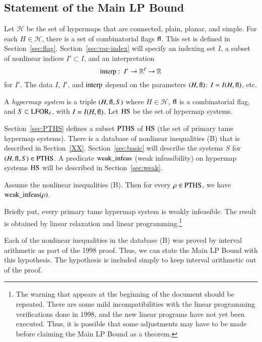 \subsection{Statement of the Main LP Bound}

Let $\mathcal H$ be the set of  hypermaps that are connected,
plain, planar, and simple. For each $H\in \mathcal H$, there is a
set of combinatorial flags ${\operatorname{fl}}$.  This set is defined in
Section~\ref{sec:flag}.  Section~\ref{sec:var-index} will specify
an indexing set $I$, a subset of nonlinear indices $I'\subset I$,
and an interpretation
  $${\operatorname{interp}}:\ I'\to \mathbb{R}^I\to\mathbb{R}$$
for $I'$.  The data $I$, $I'$, and ${\operatorname{interp}}$ depend on the
parameters $(H,{\operatorname{fl}})$: $I = I(H,{\operatorname{fl}})$, etc.

\begin{definition}
A {\it hypermap system} is a triple $(H,{\operatorname{fl}},S)$ where
    $H\in {\mathcal H}$,
    ${\operatorname{fl}}$ is a
    combinatorial flag,
    and $S\subset {\operatorname{LFOR}}_I$, with $I = I(H,{\operatorname{fl}})$.
    Let ${\operatorname{HS}}$ be the set of hypermap systems.
\end{definition}

Section~\ref{sec:PTHS} defines a subset ${\operatorname{PTHS}}$ of ${\operatorname{HS}}$
(the set of primary tame hypermap systems).  There is a database
of nonlinear inequalities (B) that is described in
Section~\ref{XX}. Section~\ref{sec:basic} will describe the
systems $S$ for $(H,{\operatorname{fl}},S)\in{\operatorname{PTHS}}$.  A predicate
${\operatorname{weak\_infeas}}$ (weak infeasibility) on hypermap systems
${\operatorname{HS}}$ will be described in Section~\ref{sec:weak}.

\begin{theorem}\label{thm:lpbound} Assume the nonlinear
inequalities (B).  Then for every $\rho\in {\operatorname{PTHS}}$, we have
${\operatorname{weak\_infeas}}(\rho)$.
\end{theorem}

Briefly put, every primary tame hypermap system is weakly
infeasible.  The result is obtained by linear relaxation and
linear programming.\footnote{The warning that appears at the
beginning of the document should be repeated.  There are some mild
incompatibilities with the linear programming verifications done
in 1998, and the new linear programs have not yet been executed.
Thus, it is possible that some adjustments may have to be made
before claiming the Main LP Bound as a theorem.}

\begin{remark}  Each of the nonlinear inequalities in the database
(B) was proved by interval arithmetic as part of the 1998 proof.
Thus, we can state the Main LP Bound with this hypothesis.  The
hypothesis is included simply to keep interval arithmetic out of
the proof.
\end{remark}

